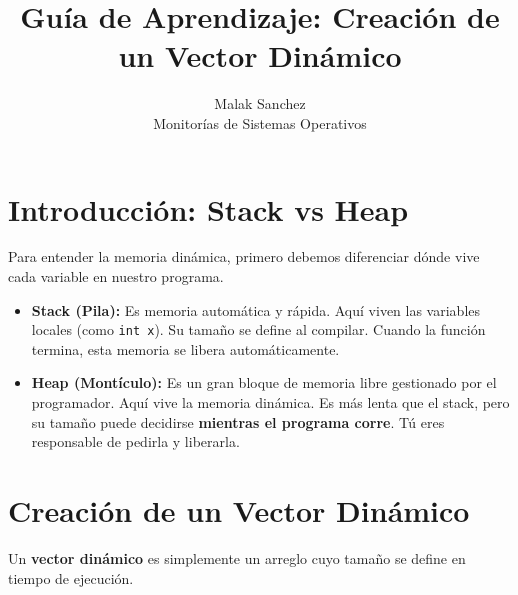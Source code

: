 \documentclass[12pt,a4paper]{article}
\title{\textbf{Guía de Aprendizaje: Creación de un Vector Dinámico}}
\author{Malak Sanchez \\ \small Monitorías de Sistemas Operativos}
\date{}
\begin{document}
\maketitle

\section{Introducción: Stack vs Heap}
Para entender la memoria dinámica, primero debemos diferenciar dónde vive cada variable en nuestro programa.

\begin{itemize}
    \item \textbf{Stack (Pila):} Es memoria automática y rápida. Aquí viven las variables locales (como \texttt{int x}). Su tamaño se define al compilar. Cuando la función termina, esta memoria se libera automáticamente.
    \item \textbf{Heap (Montículo):} Es un gran bloque de memoria libre gestionado por el programador. Aquí vive la memoria dinámica. Es más lenta que el stack, pero su tamaño puede decidirse \textbf{mientras el programa corre}. Tú eres responsable de pedirla y liberarla.
\end{itemize}

\begin{center}
\end{center}

\section{Creación de un Vector Dinámico}
Un \textbf{vector dinámico} es simplemente un arreglo cuyo tamaño se define en tiempo de ejecución.
\end{document}

